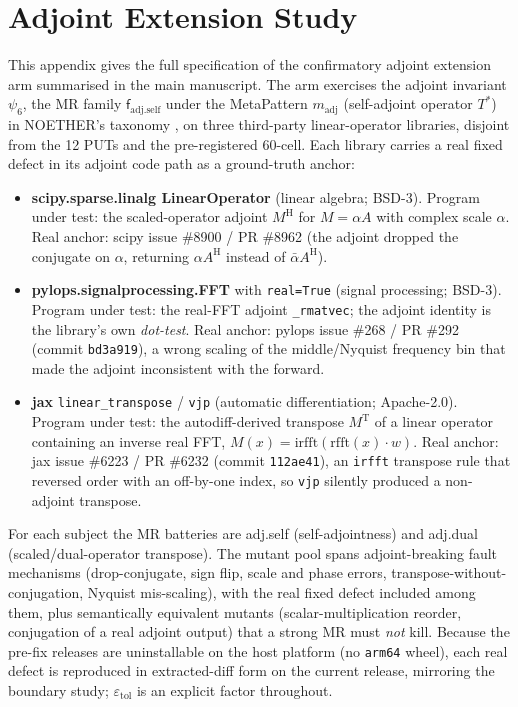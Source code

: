 \documentclass[manuscript,screen,review]{acmart}
\begin{document}
\section{Adjoint Extension Study}\label{h.-adjoint-extension-arm}

This appendix gives the full specification of the confirmatory adjoint
extension arm summarised in the main manuscript. The arm
exercises the adjoint invariant $\psi_6$, the MR family
$\mathsf{f}_{\mathrm{adj.self}}$ under the MetaPattern $m_{\mathrm{adj}}$
(self-adjoint operator $T^{*}$) in NOETHER's taxonomy
\citep{noether2026}, on three third-party
linear-operator libraries, disjoint from the 12 PUTs and the
pre-registered 60-cell. Each library carries a real fixed defect in its
adjoint code path as a ground-truth anchor:

\begin{itemize}

\item
  \textbf{scipy.sparse.linalg LinearOperator} (linear algebra; BSD-3).
  Program under test: the scaled-operator adjoint $M^{\mathrm{H}}$ for
  $M = \alpha A$ with complex scale $\alpha$. Real anchor: scipy issue
  \#8900 / PR \#8962 (the adjoint dropped the conjugate on $\alpha$,
  returning $\alpha A^{\mathrm{H}}$ instead of $\bar{\alpha}
  A^{\mathrm{H}}$).
\item
  \textbf{pylops.signalprocessing.FFT} with \texttt{real=True} (signal
  processing; BSD-3). Program under test: the real-FFT adjoint
  \texttt{\_rmatvec}; the adjoint identity is the library's own
  \emph{dot-test}. Real anchor: pylops issue \#268 / PR \#292 (commit
  \texttt{bd3a919}), a wrong scaling of the middle/Nyquist frequency bin
  that made the adjoint inconsistent with the forward.
\item
  \textbf{jax} \texttt{linear\_transpose} / \texttt{vjp} (automatic
  differentiation; Apache-2.0). Program under test: the autodiff-derived
  transpose $M^{\mathrm{T}}$ of a linear operator containing an inverse
  real FFT, $M(x) = \mathrm{irfft}(\mathrm{rfft}(x)\cdot w)$. Real anchor:
  jax issue \#6223 / PR \#6232 (commit \texttt{112ae41}), an
  \texttt{irfft} transpose rule that reversed order with an off-by-one
  index, so \texttt{vjp} silently produced a non-adjoint transpose.
\end{itemize}

For each subject the MR batteries are adj.self (self-adjointness) and
adj.dual (scaled/dual-operator transpose). The mutant pool spans
adjoint-breaking fault mechanisms (drop-conjugate, sign flip, scale and
phase errors, transpose-without-conjugation, Nyquist mis-scaling), with
the real fixed defect included among them, plus semantically equivalent
mutants (scalar-multiplication reorder, conjugation of a real adjoint
output) that a strong MR must \emph{not} kill. Because the pre-fix
releases are uninstallable on the host platform (no \texttt{arm64} wheel),
each real defect is reproduced in extracted-diff form on the current
release, mirroring the boundary study; $\varepsilon_{\mathrm{tol}}$ is an
explicit factor throughout.
\end{document}
